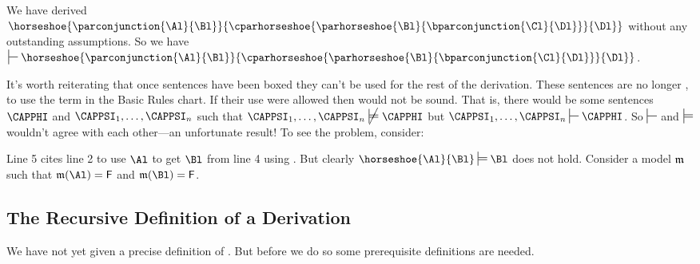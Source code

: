 \begin{gproof}[\label{secondexamplefinished}]
\end{gproof}
\noindent{}We have derived $\horseshoe{\parconjunction{\Al}{\Bl}}{\cparhorseshoe{\parhorseshoe{\Bl}{\bparconjunction{\Cl}{\Dl}}}{\Dl}}$ without any outstanding assumptions.
So we have $\sststile{}{}\horseshoe{\parconjunction{\Al}{\Bl}}{\cparhorseshoe{\parhorseshoe{\Bl}{\bparconjunction{\Cl}{\Dl}}}{\Dl}}$.

It's worth reiterating that once sentences have been boxed they can't be used for the rest of the derivation.
These sentences are no longer , to use the term in the Basic Rules chart.
If their use were allowed then \GSD{} would not be sound.
That is, there would be some sentences $\CAPPHI$ and $\CAPPSI_1,\ldots,\CAPPSI_{\integer{n}}$ such that $\CAPPSI_1,\ldots,\CAPPSI_{\integer{n}}\text{ }\cancel{\sdtstile{}{}}\text{ }\CAPPHI$ but $\CAPPSI_1,\ldots,\CAPPSI_{\integer{n}}\sststile{}{}\CAPPHI$.
So $\sststile{}{}$ and $\sdtstile{}{}$ wouldn't agree with each other---an unfortunate result!
To see the problem, consider:
\begin{gproof}
\end{gproof}
\noindent{}Line 5 cites line 2 to use $\Al$ to get $\Bl$ from line 4 using . 
But clearly $\horseshoe{\Al}{\Bl}\sdtstile{}{}\Bl$ does not hold. 
Consider a model $\mathfrak{m}$ such that $\IntA(\Al)=\FalseB$ and $\IntA(\Bl)=\FalseB$.

\subsection{The Recursive Definition of a Derivation}\label{RecDefOfDerv}
We have not yet given a precise definition of .
But before we do so some prerequisite definitions are needed.

